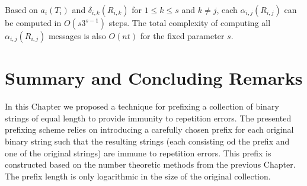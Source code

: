 Based on $a_i(T_i)$ and $\delta_{i,k}(R_{i,k})$ for $1 \leq k \leq
s$ and $k \neq j$, each $\alpha_{i,j}(R_{i,j})$ can be computed in
$O(s3^{s-1})$ steps. The total complexity of computing all
$\alpha_{i,j}(R_{i,j})$ messages is also $O(nt)$ for the fixed
parameter $s$.
\section{Summary and Concluding Remarks}

In this Chapter we proposed a technique for prefixing a collection
of binary strings of equal length to provide immunity to
repetition errors. The presented  prefixing scheme  relies on
introducing a carefully chosen prefix for each original binary
string such that the resulting strings (each consisting od the
prefix and one of the original strings) are immune to repetition
errors. This prefix is constructed based on the number theoretic
methods from the previous Chapter. The prefix length is only
logarithmic in the size of the original collection.
